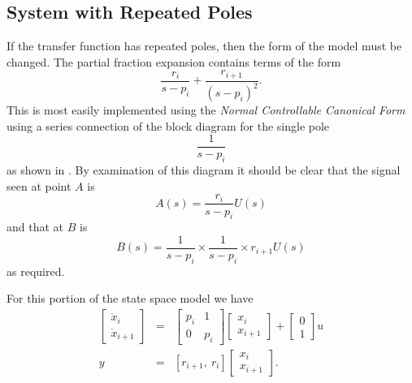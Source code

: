 \subsection*{System with Repeated Poles}

If the transfer function has repeated poles, then the form of the
model must be changed. The partial fraction expansion contains
terms of the form \[\frac{r_i}{s-p_i} +
\frac{r_{i+1}}{(s-p_i)^2}.\] This is most easily implemented using
the \emph{Normal Controllable Canonical Form} using a series
connection of the block diagram for the single pole
\[\frac{1}{s-p_i}\] as shown in . By examination
of this diagram it should be clear that the signal seen at point
$A$ is \[A(s) = \frac{r_i}{s-p_i}U(s)\] and that at $B$ is
\[B(s) = \frac{1}{s-p_i}\times\frac{1}{s-p_i}\times r_{i+1} U(s)\] as required.
\begin{slide}\label{slide:l6s4}
\end{slide}
For this portion of the state space model we have
\begin{eqnarray*}
\left[\begin{array}{c}
  \dot{x}_i \\
  \dot{x}_{i+1}
\end{array}\right] &=& \left[\begin{array}{cc}
  p_i & 1 \\
  0 & p_i
\end{array}\right]\left[\begin{array}{c}
  x_i \\
  x_{i+1}
\end{array}\right] + \left[\begin{array}{c}
  0 \\
  1
\end{array}\right] u\\
y & = & \left[r_{i+1},\ r_i\right]\left[\begin{array}{c}
  x_i \\
  x_{i+1}
\end{array}\right].
\end{eqnarray*}

